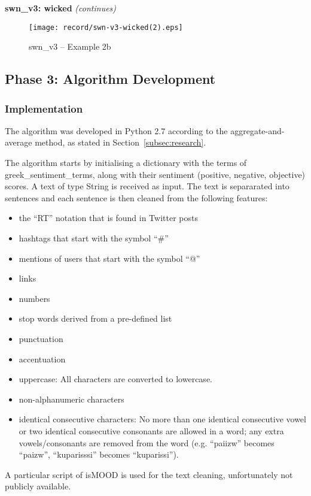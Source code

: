 \clearpage

\textbf{swn\_v3: wicked} \textit{(continues)} \\

\begin{figure}[ht]
\centering
\texttt{[image: record/swn-v3-wicked(2).eps]}
\caption{swn\_v3 -- Example 2b}
\label{fig:swn-wicked2}
\end{figure}

\clearpage

\subsection{Phase 3: Algorithm Development}
\label{subsec:algorithm}

\subsubsection{Implementation}
\label{subsubsec:algimplementation}

The algorithm was developed in Python 2.7
according to the aggregate-and-average method,
as stated in Section~\ref{subsec:research}.

The algorithm starts by initialising a dictionary
with the terms of greek\_sentiment\_terms,
along with their sentiment (positive, negative, objective) scores.
A text of type String is received as input.
The text is separarated into sentences
and each sentence is then cleaned from the following features:

\begin{itemize}
 \item the ``RT'' notation that is found in Twitter posts
 \item hashtags that start with the symbol ``\#''
 \item mentions of users that start with the symbol ``@''
 \item links
 \item numbers
 \item stop words derived from a pre-defined list
 \item punctuation
 \item accentuation
 \item uppercase: All characters are converted to lowercase.
 \item non-alphanumeric characters
 \item identical consecutive characters:
 No more than one identical consecutive vowel
 or two identical consecutive consonants are allowed in a word;
 any extra vowels/consonants are removed from the word
 (e.g. ``\textgreek{paiizw}'' becomes ``\textgreek{paizw}'',
 ``\textgreek{kuparisssi}'' becomes ``\textgreek{kuparissi}'').
\end{itemize}
A particular script of isMOOD is used for the text cleaning,
unfortunately not publicly available.

